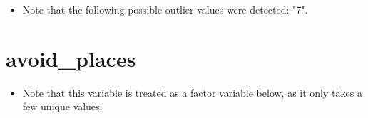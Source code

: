 \documentclass[
]{report}
\providecommand{\tightlist}{%
  \setlength{\itemsep}{0pt}\setlength{\parskip}{0pt}}
\begin{document}
\begin{itemize}
\tightlist
\item
  Note that the following possible outlier values were detected: "7".
\end{itemize}

\noindent\makebox[\linewidth]{\rule{\textwidth}{0.4pt}}

\hypertarget{avoid_places}{%
\section{avoid\_places}\label{avoid_places}}

\begin{itemize}
\tightlist
\item
  Note that this variable is treated as a factor variable below, as it
  only takes a few unique values.
\end{itemize}
\end{document}
